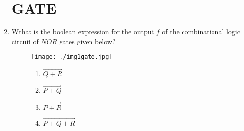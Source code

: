 \documentclass{article}
\begin{document}
\begin{enumerate}
		\section*{\centering GATE}
\item Wthat is the boolean expression for the output $f$ of the combinational logic circuit of $NOR$ gates given below$?$
\begin{figure}[H]
	\texttt{[image: ./img1gate.jpg]}
	\label{fig:fig1}
	\caption{}
	\begin{enumerate}
		\item$\vec{Q+R}$
		\item$\vec{P+Q}$
		\item$\vec{P+R}$
		\item$\vec{P+Q+R}$
	\end{enumerate}
\end{figure}
\end{enumerate}
\end{document}
